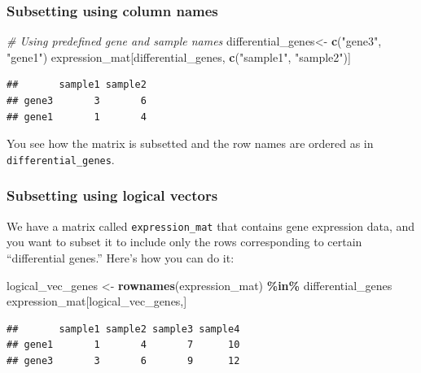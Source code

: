 \documentclass[
]{book}
\newenvironment{Shaded}{\begin{snugshade}}{\end{snugshade}}
\newcommand{\CommentTok}[1]{\textcolor[rgb]{0.56,0.35,0.01}{\textit{#1}}}
\newcommand{\FunctionTok}[1]{\textcolor[rgb]{0.13,0.29,0.53}{\textbf{#1}}}
\newcommand{\NormalTok}[1]{#1}
\newcommand{\OtherTok}[1]{\textcolor[rgb]{0.56,0.35,0.01}{#1}}
\newcommand{\SpecialCharTok}[1]{\textcolor[rgb]{0.81,0.36,0.00}{\textbf{#1}}}
\newcommand{\StringTok}[1]{\textcolor[rgb]{0.31,0.60,0.02}{#1}}
\begin{document}
\hypertarget{subsetting-using-column-names}{%
\subsubsection{Subsetting using column names}\label{subsetting-using-column-names}}

\begin{Shaded}
\begin{Highlighting}[]
\CommentTok{\# Using predefined gene and sample names}
\NormalTok{differential\_genes}\OtherTok{\textless{}{-}} \FunctionTok{c}\NormalTok{(}\StringTok{"gene3"}\NormalTok{, }\StringTok{"gene1"}\NormalTok{)}
\NormalTok{expression\_mat[differential\_genes, }\FunctionTok{c}\NormalTok{(}\StringTok{"sample1"}\NormalTok{, }\StringTok{"sample2"}\NormalTok{)]}
\end{Highlighting}
\end{Shaded}

\begin{verbatim}
##       sample1 sample2
## gene3       3       6
## gene1       1       4
\end{verbatim}

You see how the matrix is subsetted and the row names are ordered as in \texttt{differential\_genes}.

\hypertarget{subsetting-using-logical-vectors}{%
\subsubsection{Subsetting using logical vectors}\label{subsetting-using-logical-vectors}}

We have a matrix called \texttt{expression\_mat} that contains gene expression data, and you want to subset it to include only the rows corresponding to certain ``differential genes.'' Here's how you can do it:

\begin{Shaded}
\begin{Highlighting}[]
\NormalTok{logical\_vec\_genes }\OtherTok{\textless{}{-}} \FunctionTok{rownames}\NormalTok{(expression\_mat) }\SpecialCharTok{\%in\%}\NormalTok{ differential\_genes}
\NormalTok{expression\_mat[logical\_vec\_genes,]}
\end{Highlighting}
\end{Shaded}

\begin{verbatim}
##       sample1 sample2 sample3 sample4
## gene1       1       4       7      10
## gene3       3       6       9      12
\end{verbatim}
\end{document}
